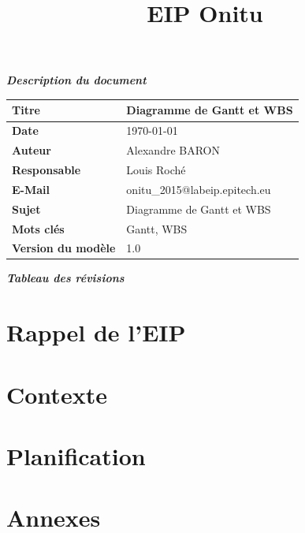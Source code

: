 \documentclass[12pt]{report}
\title{
	\huge{\textbf{\textcolor{epiBlue}{EIP Onitu} } }\\
	\Large{\textbf{\emph{\textcolor{gray}{\LongDocTitle} } } }
}
\newcommand{\rowstyle}[1]{\gdef\currentrowstyle{#1}%
  #1\ignorespaces
}
\newcommand{\LongDocTitle}{Diagramme de Gantt et WBS}
\begin{document}
\maketitle



\thispagestyle{empty}
\vspace*{10mm}
\textbf{\emph{\textcolor{epiBlue}{Description du document} } }\\

\begin{tabular}{|>{\columncolor[gray]{0.85}\color{epiBlue} \bfseries } l|l|}
\hline
	Titre & \LongDocTitle\\
\hline
	Date & \dashDate\today \\
\hline
	Auteur & Alexandre BARON\\
\hline
	Responsable & Louis Roché\\
\hline
	E-Mail & onitu\_2015@labeip.epitech.eu\\
\hline
	Sujet & \LongDocTitle\\
\hline
	Mots clés & Gantt, WBS\\
\hline
	Version du modèle & 1.0\\
\hline
\end{tabular}
\vspace*{10mm}

\textbf{\emph{\textcolor{epiBlue}{Tableau des révisions} } }\\



\tableofcontents
{}
\thispagestyle{empty}

\chapter{Rappel de l'EIP}
\thispagestyle{EIP} %
\setcounter{page}{1} %



\chapter{Contexte}

\thispagestyle{EIP}

\chapter{Planification}
\thispagestyle{EIP}


\chapter{Annexes}
\thispagestyle{EIP}
\end{document}
